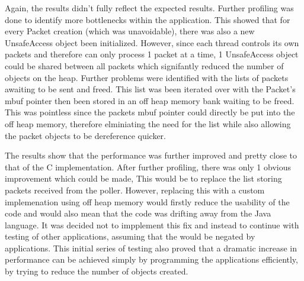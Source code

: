 \documentclass[final_report.tex]{subfiles}
\begin{document}



Again, the results didn't fully reflect the expected results. Further profiling was done to identify more bottlenecks within the application. This showed that for every Packet creation (which was unavoidable), there was also a new UnsafeAccess object been initialized. However, since each thread controls its own packets and therefore can only process 1 packet at a time, 1 UnsafeAccess object could be shared between all packets which signifantly reduced the number of objects on the heap. Further problems were identified with the lists of packets awaiting to be sent and freed. This list was been iterated over with the Packet's mbuf pointer then been stored in an off heap memory bank waiting to be freed. This was pointless since the packets mbuf pointer could directly be put into the off heap memory, therefore elminiating the need for the list while also allowing the packet objects to be dereference quicker.


The results show that the performance was further improved and pretty close to that of the C implementation. After further profiling, there was only 1 obvious improvement which could be made, This would be to replace the list storing packets received from the poller. However, replacing this with a custom implemenation using off heap memory would firstly reduce the usability of the code and would also mean that the code was drifting away from the Java language. It was decided not to impplement this fix and instead to continue with testing of other applications, assuming that the would be negated by applications. This initial series of testing also proved that a dramatic increase in performance can be achieved simply by programming the applications efficiently, by trying to reduce the number of objects created.
\end{document}
